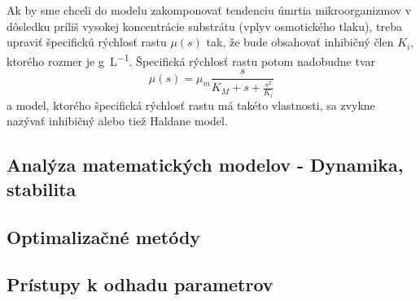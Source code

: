 Ak by sme chceli do modelu zakomponovať tendenciu úmrtia mikroorganizmov v dôsledku príliš vysokej koncentrácie substrátu (vplyv osmotického tlaku), treba upraviť špecifickú rýchlosť rastu $\mu(s)$ tak, že bude obsahovať inhibičný člen $ K_i $, ktorého rozmer je \si{\gram\per\liter}. Špecifická rýchlosť rastu potom nadobudne tvar
\begin{equation}
\mu(s) = \mu_{m}\frac{s}{K_{M} + s + \frac{s^2}{K_i}}
\end{equation}
a model, ktorého špecifická rýchlosť rastu má takéto vlastnosti, sa zvykne nazývať inhibičný alebo tiež Haldane model. 

\subsection{Analýza matematických modelov - Dynamika, stabilita}

\subsection{Optimalizačné metódy}
\subsection{Prístupy k odhadu parametrov}